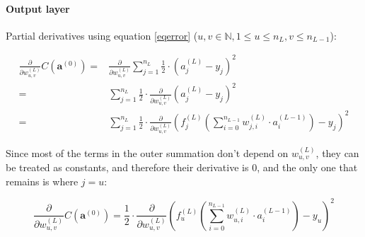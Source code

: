 \documentclass{article}
\begin{document}
        \paragraph{Output layer}

          Partial derivatives using equation \ref{eqerror}
          ($u, v \in \mathbb{N}, 1 \leq u \leq n_L, v \leq n_{L-1}$):

          \begin{equation}
            \begin{split}
              \frac{\partial}{\partial w_{u,v}^{(L)}}
                C \left( \mathbf{a}^{(0)} \right)
                  = & \frac{\partial}{\partial w_{u,v}^{(L)}}
                        \sum_{j=1}^{n_L}
                          \frac{1}{2} \cdot \left( a_j^{(L)} - y_j \right)^2 \\
                  = & \sum_{j=1}^{n_L}
                        \frac{1}{2}
                        \cdot
                        \frac{\partial}{\partial w_{u,v}^{(L)}}
                          \left( a_j^{(L)} - y_j \right)^2 \\
                  = & \sum_{j=1}^{n_L}
                        \frac{1}{2}
                        \cdot
                        \frac{\partial}{\partial w_{u,v}^{(L)}}
                          \left(
                            f_j^{(L)} \left(
                              \sum_{i=0}^{n_{L-1}}
                                w_{j,i}^{(L)} \cdot a_{i}^{(L-1)}
                            \right)
                            - y_j
                          \right)^2
            \end{split}
          \end{equation}

          Since most of the terms in the outer summation don't depend on
          $w_{u,v}^{(L)}$, they can be treated as constants, and therefore their
          derivative is 0, and the only one that remains is  where $j=u$:

          \begin{equation}
            \frac{\partial}{\partial w_{u,v}^{(L)}}
              C \left( \mathbf{a}^{(0)} \right)
                = \frac{1}{2}
                  \cdot
                  \frac{\partial}{\partial w_{u,v}^{(L)}}
                    \left(
                      f_{u}^{(L)} \left(
                        \sum_{i=0}^{n_{L-1}} w_{u,i}^{(L)} \cdot a_{i}^{(L-1)}
                      \right)
                      - y_{u}
                    \right)^2
          \end{equation}
\end{document}
